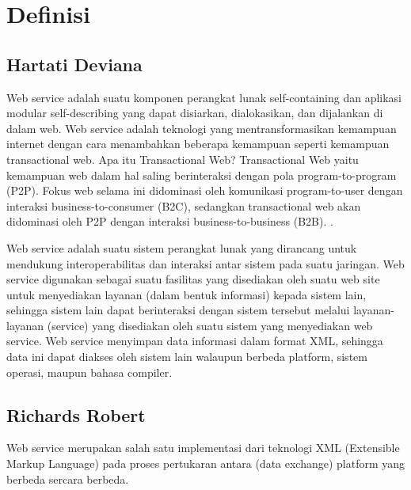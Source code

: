 



\section{Definisi}

\subsection{Hartati Deviana}

	Web service adalah suatu komponen perangkat lunak self-containing dan aplikasi modular self-describing yang dapat disiarkan, dialokasikan, dan dijalankan di dalam web. Web service adalah teknologi yang mentransformasikan kemampuan internet dengan cara menambahkan beberapa kemampuan seperti kemampuan transactional web. Apa itu Transactional Web? Transactional Web yaitu kemampuan web dalam hal saling berinteraksi dengan pola program-to-program (P2P). Fokus web selama ini didominasi oleh komunikasi program-to-user dengan interaksi business-to-consumer (B2C), sedangkan transactional web akan didominasi oleh P2P dengan interaksi business-to-business (B2B). \cite{deviana2013penerapan}.

	Web service adalah suatu sistem perangkat lunak yang dirancang untuk mendukung interoperabilitas dan interaksi antar sistem pada suatu jaringan. Web service digunakan sebagai suatu fasilitas yang disediakan oleh suatu web site untuk menyediakan layanan (dalam bentuk informasi) kepada sistem lain, sehingga sistem lain dapat berinteraksi dengan sistem tersebut melalui layanan-layanan (service) yang disediakan oleh suatu sistem yang menyediakan web service. Web service menyimpan data informasi dalam format XML, sehingga data ini dapat diakses oleh sistem lain walaupun berbeda platform, sistem operasi, maupun bahasa compiler. 

\subsection{Richards Robert}

	Web service merupakan salah satu implementasi dari teknologi XML (Extensible Markup Language) pada proses pertukaran antara (data exchange) platform yang berbeda sercara berbeda.

